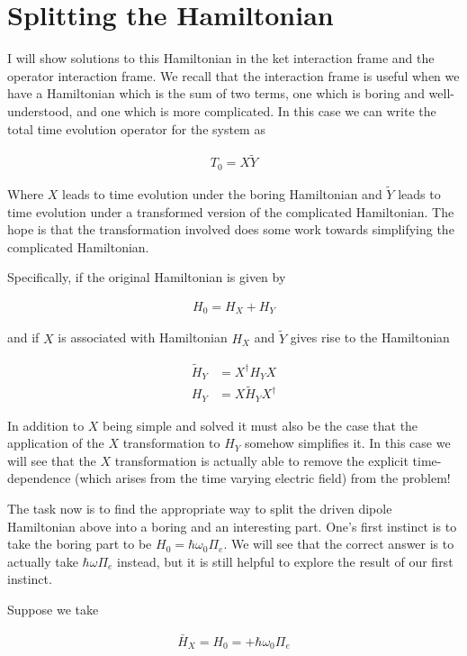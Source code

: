 \documentclass[12pt]{article}
\begin{document}
\section{Splitting the Hamiltonian}

I will show solutions to this Hamiltonian in the ket interaction frame and the operator interaction frame. We recall that the interaction frame is useful when we have a Hamiltonian which is the sum of two terms, one which is boring and well-understood, and one which is more complicated. In this case we can write the total time evolution operator for the system as

\begin{align}
T_0 = X\tilde{Y}
\end{align}

Where $X$ leads to time evolution under the boring Hamiltonian and $\tilde{Y}$ leads to time evolution under a transformed version of the complicated Hamiltonian. The hope is that the transformation involved does some work towards simplifying the complicated Hamiltonian.

Specifically, if the original Hamiltonian is given by

\begin{align}
H_0 = H_X + H_Y
\end{align}

and if $X$ is associated with Hamiltonian $H_X$ and $\tilde{Y}$ gives rise to the Hamiltonian 

\begin{align}
\tilde{H}_Y &= X^{\dag}H_YX\\
H_Y &= X \tilde{H}_Y X^{\dag}
\end{align}

In addition to $X$ being simple and solved it must also be the case that the application of the $X$ transformation to $H_Y$ somehow simplifies it. In this case we will see that the $X$ transformation is actually able to remove the explicit time-dependence (which arises from the time varying electric field) from the problem!

The task now is to find the appropriate way to split the driven dipole Hamiltonian above into a boring and an interesting part. One's first instinct is to take the boring part to be $H_0 = \hbar\omega_0 \Pi_{e}$. We will see that the correct answer is to actually take $\hbar\omega \Pi_{e}$ instead, but it is still helpful to explore the result of our first instinct.

Suppose we take

\begin{align}
\bar{H}_X = H_0 = +\hbar\omega_0 \Pi_{e}
\end{align}
\end{document}
